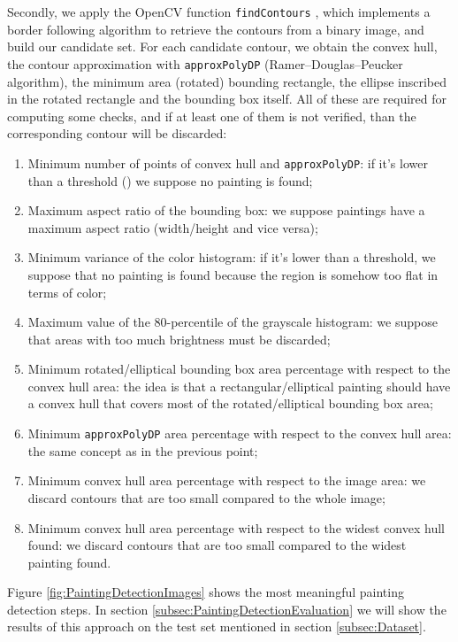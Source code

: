 \documentclass[10pt,twocolumn,letterpaper]{article}
\begin{document}
Secondly, we apply the OpenCV function \texttt{findContours} \cite{journals/cvgip/SuzukiA85}, which implements a border following algorithm to retrieve the contours from a binary image, and build our candidate set.
For each candidate contour, we obtain the convex hull, the contour approximation with \texttt{approxPolyDP} \cite{approxPolyDP} (Ramer–Douglas–Peucker algorithm), the minimum area (rotated) bounding rectangle, the ellipse inscribed in the rotated rectangle and the bounding box itself. All of these are required for computing some checks, and if at least one of them is not verified, than the corresponding contour will be discarded:
\begin{enumerate}
    \item Minimum number of points of convex hull and \texttt{approxPolyDP}: if it's lower than a threshold () we suppose no painting is found;
    \item Maximum aspect ratio of the bounding box: we suppose paintings have a maximum aspect ratio (width/height and vice versa); 
    \item Minimum variance of the color histogram: if it's lower than a threshold, we suppose that no painting is found because the region is somehow too flat in terms of color;
    \item Maximum value of the 80-percentile of the grayscale histogram: we suppose that areas with too much brightness must be discarded;
    \item Minimum rotated/elliptical bounding box area percentage with respect to the convex hull area: the idea is that a rectangular/elliptical painting should have a convex hull that covers most of the rotated/elliptical bounding box area;
    \item Minimum \texttt{approxPolyDP} area percentage with respect to the convex hull area: the same concept as in the previous point;
    \item Minimum convex hull area percentage with respect to the image area: we discard contours that are too small compared to the whole image;
    \item Minimum convex hull area percentage with respect to the widest convex hull found: we discard contours that are too small compared to the widest painting found.
\end{enumerate}

Figure \ref{fig:PaintingDetectionImages} shows the most meaningful painting detection steps. In section \ref{subsec:PaintingDetectionEvaluation} we will show the results of this approach on the test set mentioned in section \ref{subsec:Dataset}.
\end{document}
